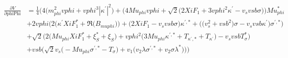 \begin{align}
\frac{\partial V}{\partial \text{phiPhi}} &= \frac{1}{4} \Big(4 \Big(m_{phi}^2 vphi  + vphi^{3} |\kappa^\prime|^2 \Big)+\Big(4 Mu_{phi} vphi  + \sqrt{2} \Big(2 XiF_1  + 3 vphi^{2} \kappa^\prime  - v_s vsb \sigma \Big)\Big)Mu_{phi}^* \nonumber \\ 
 &+2 vphi \Big(2 \Big(\kappa^\prime XiF_1^*  + {\Re\Big(B_{muphi}\Big)}\Big) + \Big(2 XiF_1  - v_s vsb \sigma \Big)\kappa^{\prime,*}  + \Big(\Big(v_{s}^{2} + vsb^{2}\Big)\sigma  - v_s vsb \kappa^\prime \Big)\sigma^{\prime,*} \Big)\nonumber \\ 
 &+\sqrt{2} \Big(2 \Big(Mu_{phi} XiF_1^*  + \xi_S^* + \xi_S\Big) + vphi^{2} \Big(3 Mu_{phi} \kappa^{\prime,*}  + T_{\kappa^{\prime},*} + T_{\kappa^\prime}\Big) - v_s vsb T_{\sigma}^* \Big)\nonumber \\ 
 &+vsb \Big(\sqrt{2} v_s \Big(- Mu_{phi} \sigma^{\prime,*}  - T_{\sigma} \Big) + v_1 \Big(v_2 \lambda \sigma^{\prime,*}  + v_2 \sigma \lambda^* \Big)\Big)\Big)
\end{align} 
